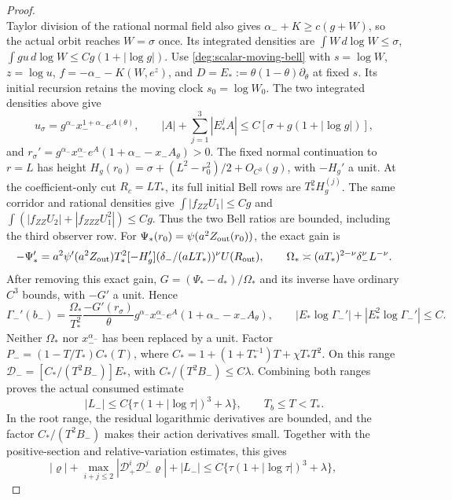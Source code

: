 \begin{proof}
\[\]
Taylor division of the rational normal field also gives
\(\alpha_-+K\ge c(g+W)\), so the actual orbit reaches \(W=\sigma\)
once. Its integrated densities are
\(\int W\,d\log W\le\sigma\),
\(\int gu\,d\log W\le Cg(1+|\log g|)\).
Use \eqref{deg:scalar-moving-bell} with \(s=\log W\),
\(z=\log u\), \(f=-\alpha_--K(W,e^z)\), and
\(D=E_*:=\theta(1-\theta)\partial_\theta\) at fixed \(s\).
Its initial recursion retains the moving clock
\(s_0=\log W_0\). The two integrated densities above give
\[
 u_\sigma=g^{\alpha_-}x_-^{1+\alpha_-}e^{A(\theta)},\qquad
 |A|+\sum_{j=1}^3|E_*^jA|\le C[\sigma+g(1+|\log g|)],
\]
and \(r_\sigma'=g^{\alpha_-}x_-^{\alpha_-}e^A
(1+\alpha_--x_-A_\theta)>0\).
The fixed normal continuation to \(r=L\) has height
\(H_g(r_0)=\sigma+(L^2-r_0^2)/2+O_{C^3}(g)\), with
\(-H_g'\) a unit. At the coefficient-only cut \(R_c=LT_*\),
its full initial Bell rows are \(T_*^2H_g^{(j)}\).
The same corridor and rational densities give
\(\int|f_{ZZ}U_1|\le Cg\) and
\(\int(|f_{ZZ}U_2|+|f_{ZZZ}U_1^2|)\le Cg\).
Thus the two Bell ratios are bounded, including the third observer row.
For \(\Psi_*(r_0)=\psi(a^2Z_{\rm out}(r_0))\), the exact gain is
\[
 -\Psi_*'=a^2\psi'(a^2Z_{\rm out})T_*^2[-H_g']
                      (\delta_-/(aLT_*))^\nu U(R_{\rm out}),\qquad
 \Omega_*\asymp(aT_*)^{2-\nu}\delta_-^\nu L^{-\nu}.
\]
After removing this exact gain, \(G=(\Psi_*-d_*)/\Omega_*\) and its
inverse have ordinary \(C^3\) bounds, with \(-G'\) a unit. Hence
\[
 \Gamma_-'(b_-)=\frac{\Omega_*}{T_*^2}
 \frac{-G'(r_\sigma)}\theta g^{\alpha_-}x_-^{\alpha_-}e^A
                         (1+\alpha_--x_-A_\theta),\qquad
 |E_*\log\Gamma_-'|+|E_*^2\log\Gamma_-'|\le C.
\]
Neither \(\Omega_*\) nor \(x_-^{\alpha_-}\) has been replaced by a
unit. Factor \(P_-=(1-T/T_*)C_*(T)\), where
\(C_*=1+(1+T_*^{-1})T+\chi T_*T^2\).
On this range \(\mathcal D_-=[C_*/(T^2B_-)]E_*\), with
\(C_*/(T^2B_-)\le C\lambda\). Combining both ranges proves the actual
consumed estimate
\begin{equation}\label{deg:far-negative-budget}
 |L_-|\le C\{\tau(1+|\log\tau|)^3+\lambda\},
                       \qquad T_b\le T<T_*.
\end{equation}
In the root range, the residual logarithmic derivatives are bounded,
and the factor \(C_*/(T^2B_-)\) makes their action derivatives small.
Together with the positive-section and relative-variation estimates,
this gives
\begin{equation}\label{deg:far-bell}
 |\varrho|+\max_{i+j\le2}|\mathcal D_+^i\mathcal D_-^j\varrho|
 +|L_-|\le C\{\tau(1+|\log\tau|)^3+\lambda\},\qquad

\end{equation}
\end{proof}
